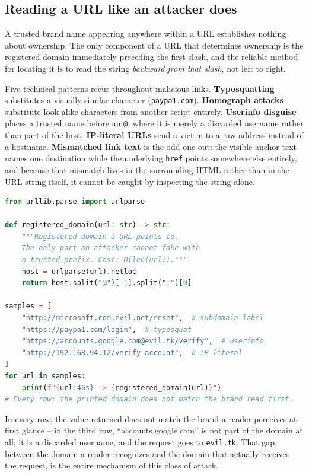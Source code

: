 \subsection{Reading a URL like an attacker does}

A trusted brand name appearing anywhere within a URL establishes nothing about ownership. The only
component of a URL that determines ownership is the registered domain immediately preceding the
first slash, and the reliable method for locating it is to read the string \emph{backward from that
slash}, not left to right.

Five technical patterns recur throughout malicious links. \textbf{Typosquatting} substitutes a
visually similar character (\texttt{paypa1.com}). \textbf{Homograph attacks} substitute look-alike
characters from another script entirely. \textbf{Userinfo disguise} places a trusted name before an
\texttt{@}, where it is merely a discarded username rather than part of the host. \textbf{IP-literal
URLs} send a victim to a raw address instead of a hostname. \textbf{Mismatched link text} is the odd
one out: the visible anchor text names one destination while the underlying \texttt{href} points
somewhere else entirely, and because that mismatch lives in the surrounding HTML rather than in the
URL string itself, it cannot be caught by inspecting the string alone.

\begin{lstlisting}[language=Python, caption={A single function, tested against four of the five patterns above}]
from urllib.parse import urlparse

def registered_domain(url: str) -> str:
    """Registered domain a URL points to.
    The only part an attacker cannot fake with
    a trusted prefix. Cost: O(len(url))."""
    host = urlparse(url).netloc
    return host.split("@")[-1].split(":")[0]

samples = [
    "http://microsoft.com.evil.net/reset",  # subdomain label
    "https://paypa1.com/login",  # typosquat
    "https://accounts.google.com@evil.tk/verify",  # userinfo
    "http://192.168.94.12/verify-account",  # IP literal
]
for url in samples:
    print(f"{url:46s} -> {registered_domain(url)}")
# Every row: the printed domain does not match the brand read first.
\end{lstlisting}

In every row, the value returned does not match the brand a reader perceives at first glance -- in
the third row, ``accounts.google.com'' is not part of the domain at all; it is a discarded
username, and the request goes to \texttt{evil.tk}. That gap, between the domain a reader
recognizes and the domain that actually receives the request, is the entire mechanism of this
class of attack.

